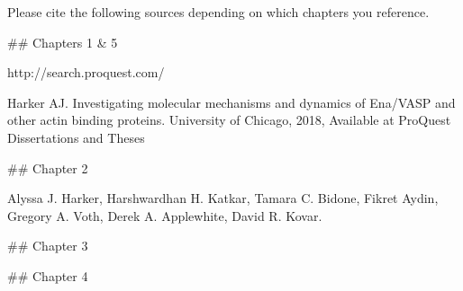 Please cite the following sources depending on which chapters you
reference.

## Chapters 1 & 5

http://search.proquest.com/

Harker AJ. Investigating molecular mechanisms and dynamics of Ena/VASP and other actin binding proteins. University of Chicago, 2018, Available
at ProQuest Dissertations and Theses

## Chapter 2

Alyssa J. Harker, Harshwardhan H. Katkar, Tamara C. Bidone, Fikret Aydin, Gregory A. Voth, Derek A. Applewhite, David R. Kovar. 

## Chapter 3



## Chapter 4

